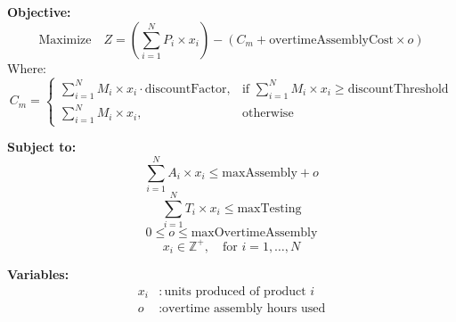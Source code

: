 \documentclass{article}
\begin{document}
\textbf{Objective:}
\[
\text{Maximize} \quad Z = \left( \sum_{i=1}^{N} P_i \times x_i \right) - \left( C_m + \text{overtimeAssemblyCost} \times o \right)
\]
Where:
\[
C_m = \begin{cases} 
\sum_{i=1}^{N} M_i \times x_i \cdot \text{discountFactor}, & \text{if } \sum_{i=1}^{N} M_i \times x_i \geq \text{discountThreshold} \\
\sum_{i=1}^{N} M_i \times x_i, & \text{otherwise}
\end{cases}
\]

\textbf{Subject to:}
\[
\sum_{i=1}^{N} A_i \times x_i \leq \text{maxAssembly} + o
\]
\[
\sum_{i=1}^{N} T_i \times x_i \leq \text{maxTesting}
\]
\[
0 \leq o \leq \text{maxOvertimeAssembly}
\]
\[
x_i \in \mathbb{Z}^+, \quad \text{for } i = 1, \ldots, N
\]

\textbf{Variables:}
\begin{align*}
x_i &: \text{units produced of product } i \\
o &: \text{overtime assembly hours used}
\end{align*}
\end{document}
